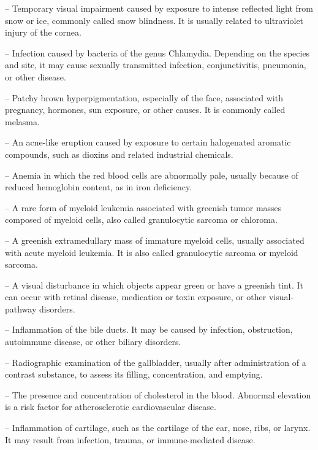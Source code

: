 -- Temporary visual impairment caused by exposure to intense reflected light from snow or ice, commonly called snow blindness. It is usually related to ultraviolet injury of the cornea.



-- Infection caused by bacteria of the genus Chlamydia. Depending on the species and site, it may cause sexually transmitted infection, conjunctivitis, pneumonia, or other disease.

-- Patchy brown hyperpigmentation, especially of the face, associated with pregnancy, hormones, sun exposure, or other causes. It is commonly called melasma.

-- An acne-like eruption caused by exposure to certain halogenated aromatic compounds, such as dioxins and related industrial chemicals.

-- Anemia in which the red blood cells are abnormally pale, usually because of reduced hemoglobin content, as in iron deficiency.

-- A rare form of myeloid leukemia associated with greenish tumor masses composed of myeloid cells, also called granulocytic sarcoma or chloroma.

-- A greenish extramedullary mass of immature myeloid cells, usually associated with acute myeloid leukemia. It is also called granulocytic sarcoma or myeloid sarcoma.

-- A visual disturbance in which objects appear green or have a greenish tint. It can occur with retinal disease, medication or toxin exposure, or other visual-pathway disorders.

-- Inflammation of the bile ducts. It may be caused by infection, obstruction, autoimmune disease, or other biliary disorders.


-- Radiographic examination of the gallbladder, usually after administration of a contrast substance, to assess its filling, concentration, and emptying.

-- The presence and concentration of cholesterol in the blood. Abnormal elevation is a risk factor for atherosclerotic cardiovascular disease.

-- Inflammation of cartilage, such as the cartilage of the ear, nose, ribs, or larynx. It may result from infection, trauma, or immune-mediated disease.

